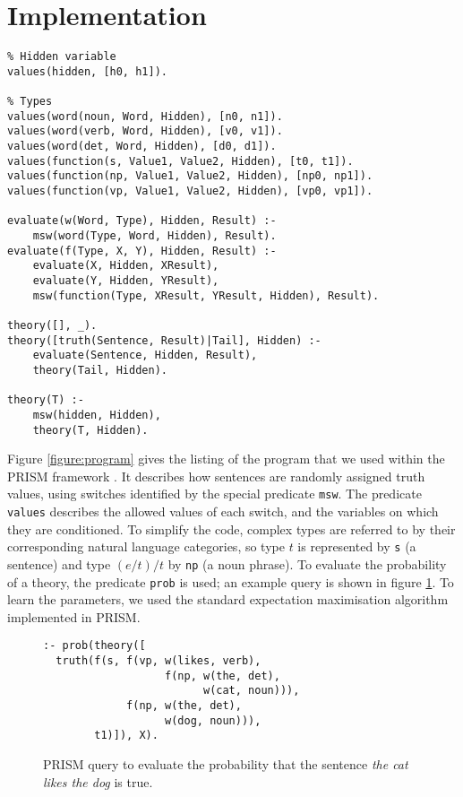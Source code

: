 \documentclass[letterpaper]{article}
\begin{document}
\section{Implementation}

\begin{figure*}
\centering
\begin{lstlisting}
% Hidden variable
values(hidden, [h0, h1]).

% Types
values(word(noun, Word, Hidden), [n0, n1]).
values(word(verb, Word, Hidden), [v0, v1]).
values(word(det, Word, Hidden), [d0, d1]).
values(function(s, Value1, Value2, Hidden), [t0, t1]).
values(function(np, Value1, Value2, Hidden), [np0, np1]).
values(function(vp, Value1, Value2, Hidden), [vp0, vp1]).

evaluate(w(Word, Type), Hidden, Result) :-
	msw(word(Type, Word, Hidden), Result).
evaluate(f(Type, X, Y), Hidden, Result) :-
	evaluate(X, Hidden, XResult),
	evaluate(Y, Hidden, YResult),
	msw(function(Type, XResult, YResult, Hidden), Result).

theory([], _).
theory([truth(Sentence, Result)|Tail], Hidden) :-
	evaluate(Sentence, Hidden, Result),
	theory(Tail, Hidden).

theory(T) :-
	msw(hidden, Hidden),
	theory(T, Hidden).
\end{lstlisting}
\caption{A PRISM program describing probability distributions over
  natural language models used for our examples.}
\label{figure:program}
\end{figure*}

Figure \ref{figure:program} gives the listing of the program that we
used within the PRISM framework \cite{Sato:97}. It describes how
sentences are randomly assigned truth values, using switches
identified by the special predicate \texttt{msw}. The predicate
\texttt{values} describes the allowed values of each switch, and the
variables on which they are conditioned. To simplify the code, complex
types are referred to by their corresponding natural language
categories, so type $t$ is represented by \texttt{s} (a sentence) and
type $(e/t)/t$ by \texttt{np} (a noun phrase). To evaluate the
probability of a theory, the predicate \texttt{prob} is used; an
example query is shown in figure \ref{figure:query}. To learn the
parameters, we used the standard expectation maximisation algorithm
implemented in PRISM.

\begin{figure}
\begin{lstlisting}
:- prob(theory([
  truth(f(s, f(vp, w(likes, verb),
                   f(np, w(the, det),
                         w(cat, noun))),
             f(np, w(the, det),
                   w(dog, noun))),
        t1)]), X).
\end{lstlisting}
\caption{PRISM query to evaluate the probability that the sentence
  \emph{the cat likes the dog} is true.}
\label{figure:query}
\end{figure}
\end{document}
